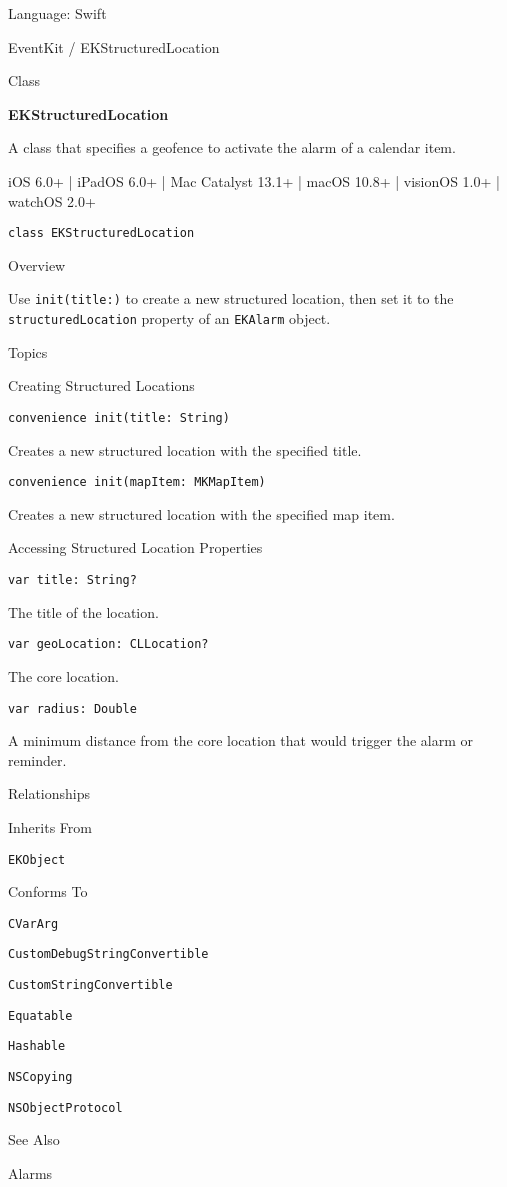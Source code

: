 \documentclass{article}
\title{}
\author{}
\date{}
\begin{document}
Language: Swift

EventKit / EKStructuredLocation

Class

\textbf{EKStructuredLocation}

A class that specifies a geofence to activate the alarm of a calendar item.

iOS 6.0+ | iPadOS 6.0+ | Mac Catalyst 13.1+ | macOS 10.8+ | visionOS 1.0+ | watchOS 2.0+

\texttt{class EKStructuredLocation}

Overview

Use \texttt{init(title:)} to create a new structured location, then set it to the \texttt{structuredLocation} property of an \texttt{EKAlarm} object.

Topics

Creating Structured Locations

\texttt{convenience init(title: String)}

Creates a new structured location with the specified title.

\texttt{convenience init(mapItem: MKMapItem)}

Creates a new structured location with the specified map item.

Accessing Structured Location Properties

\texttt{var title: String?}

The title of the location.

\texttt{var geoLocation: CLLocation?}

The core location.

\texttt{var radius: Double}

A minimum distance from the core location that would trigger the alarm or reminder.

Relationships

Inherits From

\texttt{EKObject}

Conforms To

\texttt{CVarArg}

\texttt{CustomDebugStringConvertible}

\texttt{CustomStringConvertible}

\texttt{Equatable}

\texttt{Hashable}

\texttt{NSCopying}

\texttt{NSObjectProtocol}

See Also

Alarms
\end{document}
